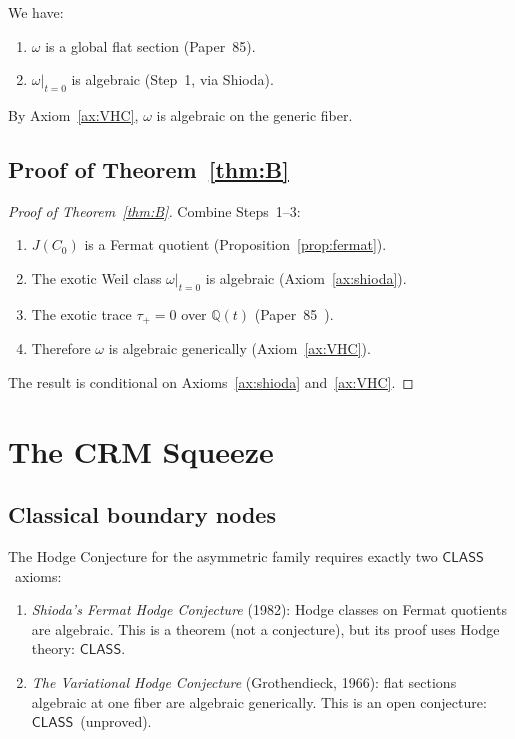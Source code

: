 \documentclass[11pt]{article}
\theoremstyle{plain}
\theoremstyle{definition}
\theoremstyle{remark}
\newcommand{\Q}{\mathbb{Q}}
\newcommand{\CLASS}{\ensuremath{\mathsf{CLASS}}}
\begin{document}
We have:
\begin{enumerate}[nosep]
  \item $\omega$ is a global flat section (Paper~85).
  \item $\omega|_{t=0}$ is algebraic (Step~1, via Shioda).
\end{enumerate}
By Axiom~\ref{ax:VHC}, $\omega$ is algebraic on the generic fiber.

\subsection{Proof of Theorem~\ref{thm:B}}

\begin{proof}[Proof of Theorem~\ref{thm:B}]
Combine Steps~1--3:
\begin{enumerate}
  \item $J(C_0)$ is a Fermat quotient (Proposition~\ref{prop:fermat}).
  \item The exotic Weil class $\omega|_{t=0}$ is algebraic
        (Axiom~\ref{ax:shioda}).
  \item The exotic trace $\tau_+ = 0$ over $\Q(t)$
        (Paper~85~\cite{P85}).
  \item Therefore $\omega$ is algebraic generically
        (Axiom~\ref{ax:VHC}).
\end{enumerate}
The result is conditional on Axioms~\ref{ax:shioda}
and~\ref{ax:VHC}.
\end{proof}

\section{The CRM Squeeze}
\label{sec:squeeze}

\subsection{Classical boundary nodes}

The Hodge Conjecture for the asymmetric family requires exactly
two \CLASS\ axioms:
\begin{enumerate}[label=(\roman*)]
  \item \emph{Shioda's Fermat Hodge Conjecture} (1982):
    Hodge classes on Fermat quotients are algebraic.
    This is a theorem (not a conjecture), but its proof uses
    Hodge theory: \CLASS.
  \item \emph{The Variational Hodge Conjecture} (Grothendieck, 1966):
    flat sections algebraic at one fiber are algebraic generically.
    This is an open conjecture: \CLASS\ (unproved).
\end{enumerate}
\end{document}
